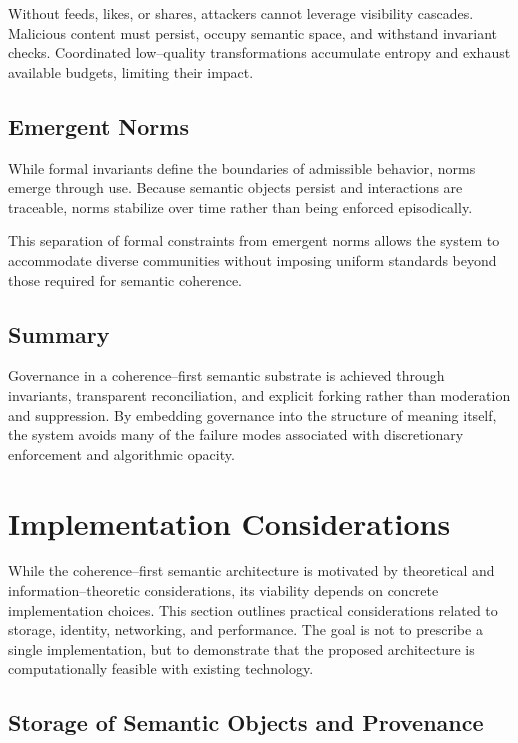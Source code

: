 \documentclass[11pt]{article}
\begin{document}
Without feeds, likes, or shares, attackers cannot leverage visibility cascades. Malicious
content must persist, occupy semantic space, and withstand invariant checks. Coordinated
low--quality transformations accumulate entropy and exhaust available budgets, limiting
their impact.

\subsection{Emergent Norms}

While formal invariants define the boundaries of admissible behavior, norms emerge through
use. Because semantic objects persist and interactions are traceable, norms stabilize over
time rather than being enforced episodically.

This separation of formal constraints from emergent norms allows the system to accommodate
diverse communities without imposing uniform standards beyond those required for semantic
coherence.

\subsection{Summary}

Governance in a coherence--first semantic substrate is achieved through invariants,
transparent reconciliation, and explicit forking rather than moderation and suppression.
By embedding governance into the structure of meaning itself, the system avoids many of
the failure modes associated with discretionary enforcement and algorithmic opacity.

\section{Implementation Considerations}

While the coherence--first semantic architecture is motivated by theoretical and
information--theoretic considerations, its viability depends on concrete implementation
choices. This section outlines practical considerations related to storage, identity,
networking, and performance. The goal is not to prescribe a single implementation, but to
demonstrate that the proposed architecture is computationally feasible with existing
technology.

\subsection{Storage of Semantic Objects and Provenance}
\end{document}
